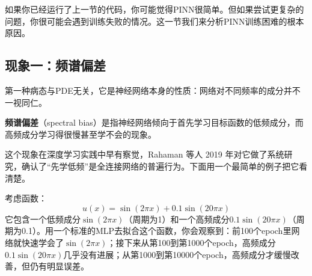 如果你已经运行了上一节的代码，你可能觉得PINN很简单。但如果尝试更复杂的问题，你很可能会遇到训练失败的情况。这一节我们来分析PINN训练困难的根本原因。

\subsection{现象一：频谱偏差}

第一种病态与PDE无关，它是神经网络本身的性质：网络对不同频率的成分并不一视同仁。

\begin{definition}[频谱偏差]
\textbf{频谱偏差}（spectral bias）是指神经网络倾向于首先学习目标函数的低频成分，而高频成分学习得很慢甚至学不会的现象。
\end{definition}

这个现象在深度学习实践中早有察觉，Rahaman 等人 2019 年对它做了系统研究，确认了“先学低频”是全连接网络的普遍行为。下面用一个最简单的例子把它看清楚。

\begin{example}[高频函数的逼近困难]
考虑函数：
\begin{equation}
    u(x) = \sin(2\pi x) + 0.1\sin(20\pi x)
\end{equation}
它包含一个低频成分$\sin(2\pi x)$（周期为1）和一个高频成分$0.1\sin(20\pi x)$（周期为0.1）。用一个标准的MLP去拟合这个函数，你会观察到：前100个epoch里网络就快速学会了$\sin(2\pi x)$；接下来从第100到第1000个epoch，高频成分$0.1\sin(20\pi x)$几乎没有进展；从第1000到第10000个epoch，高频成分才缓慢改善，但仍有明显误差。
\end{example}

